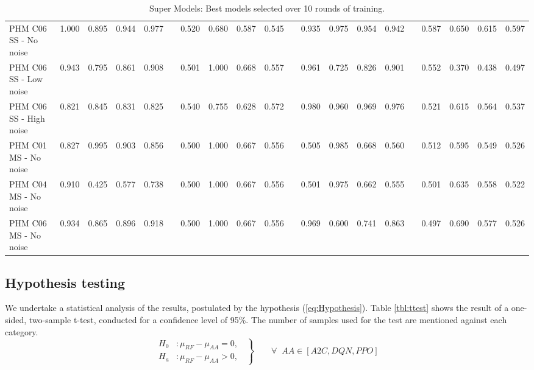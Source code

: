 \documentclass[a4paper, 12pt]{article}
\begin{document}
\begin{landscape}
\begin{table}
\begin{tabular}{@{}l rrrr c rrrr c rrrr c rrrr@{}}
			PHM C06 SS - No noise &1.000 &0.895 &0.944 & 0.977 & & 0.520 &0.680 &0.587 &0.545 & &0.935 &0.975 &0.954 &0.942 & &0.587 &0.650 &0.615&0.597\\
			PHM C06 SS - Low noise &0.943 &0.795 &0.861 & 0.908 & & 0.501 &1.000 &0.668 &0.557 & &0.961 &0.725 &0.826 &0.901 & &0.552 &0.370 &0.438&0.497\\
			PHM C06 SS - High noise &0.821 &0.845 &0.831 & 0.825 & & 0.540 &0.755 &0.628 &0.572 & &0.980 &0.960 &0.969 &0.976 & &0.521 &0.615 &0.564&0.537\\\midrule
			
			PHM C01 MS - No noise &0.827 &0.995 &0.903 & 0.856 & & 0.500 &1.000 &0.667 &0.556 & &0.505 &0.985 &0.668 &0.560 & &0.512 &0.595 &0.549&0.526\\
			PHM C04 MS - No noise &0.910 &0.425 &0.577 & 0.738 & & 0.500 &1.000 &0.667 &0.556 & &0.501 &0.975 &0.662 &0.555 & &0.501 &0.635 &0.558&0.522\\
			PHM C06 MS - No noise &0.934 &0.865 &0.896 & 0.918 & & 0.500 &1.000 &0.667 &0.556 & &0.969 &0.600 &0.741 &0.863 & &0.497 &0.690 &0.577&0.526\\			
			\bottomrule
		\end{tabular}
		\caption{Super Models: Best models selected over 10 rounds of training.}
		\label{tbl:SuperModels}
	\end{table}
\end{landscape}
\restoregeometry 
{}


\subsection{Hypothesis testing}
We undertake a statistical analysis of the results, postulated by the hypothesis (\ref{eq:Hypothesis}). Table \ref{tbl:ttest} shows the result of a one-sided, two-sample t-test, conducted for a confidence level of 95\%. The number of samples used for the test are mentioned against each category.
\begin{equation}
	\left.\begin{aligned}
		H_0 & : \mu_{RF} - \mu_{AA} = 0,\;\; \\
		H_a & : \mu_{RF} - \mu_{AA} > 0, \;\;
	\end{aligned}
	\right\}
	\qquad \forall \;\; \text{$AA \in[A2C, DQN, PPO]$}
	\label{eq:Hypothesis}
\end{equation}
\end{document}
